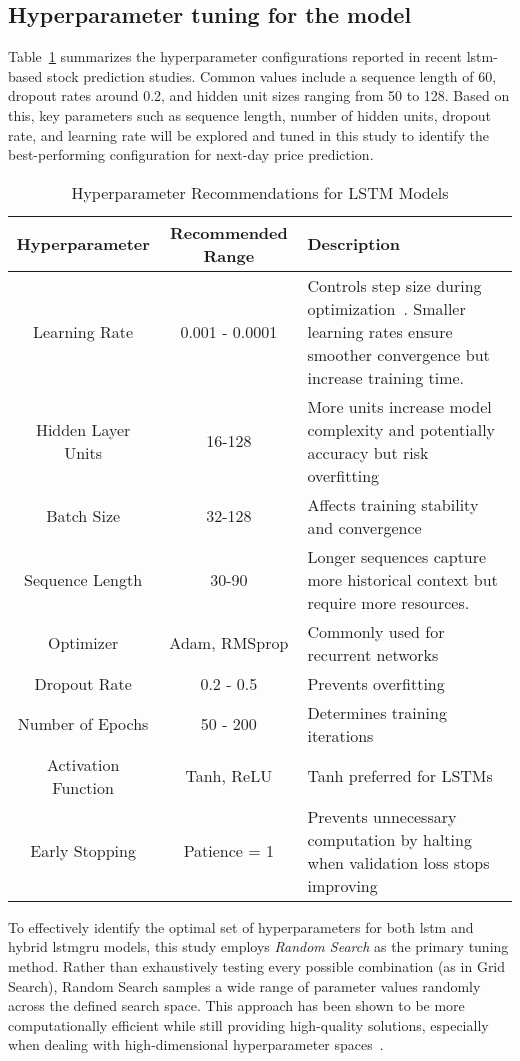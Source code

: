 \subsection{Hyperparameter tuning for the model }

Table~\ref{tab:hyperparamsconf} summarizes the hyperparameter configurations 
reported in recent \acrshort{lstm}-based stock prediction studies. Common values include a 
sequence length of 60, dropout rates around 0.2, and hidden unit sizes ranging from 50 to 
128. Based on this, key parameters such as sequence length, number of hidden units, dropout
rate, and learning rate will be explored and tuned in this study to identify the 
best-performing configuration for next-day price prediction.

\begin{table}[H]
\centering
\caption{Hyperparameter Recommendations for LSTM Models}
\label{tab:hyperparamsconf}
\begin{tabular}{ccp{6.5cm}}
\hline
\textbf{Hyperparameter} & \textbf{Recommended Range} & \textbf{Description} \\ \hline\hline
Learning Rate & 0.001 - 0.0001 & Controls step size during optimization~\parencite{parmar2018stock}. 
Smaller learning rates ensure smoother convergence but increase training time.\\
Hidden Layer Units & 16-128 & More units increase model complexity and potentially accuracy but risk overfitting \\
Batch Size & 32-128 & Affects training stability and convergence \\
Sequence Length & 30-90 & Longer sequences capture more historical context but require more resources. \\
Optimizer & Adam, RMSprop & Commonly used for recurrent networks \\
Dropout Rate & 0.2 - 0.5 & Prevents overfitting~\parencite{agrawal2022StockPrediction} \\
Number of Epochs & 50 - 200 & Determines training iterations \\
Activation Function & Tanh, ReLU & Tanh preferred for LSTMs \\
Early Stopping & Patience = 1 & Prevents unnecessary computation by halting when validation loss 
stops improving~\parencite{chang2024StockPrediction} \\
\hline
\end{tabular}
\end{table}

To effectively identify the optimal set of hyperparameters for both \acrshort{lstm} and hybrid \acrshort{lstmgru} models, 
this study employs \emph{Random Search} as the primary tuning method. Rather than exhaustively testing every possible 
combination (as in Grid Search), Random Search samples a wide range of parameter values randomly across the defined search 
space. This approach has been shown to be more computationally efficient while still providing high-quality solutions,
especially when dealing with high-dimensional hyperparameter spaces~\parencite{bergstra2012random}.

